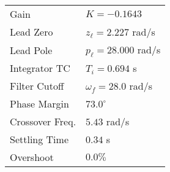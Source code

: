 \begin{tabular}{ll}
Gain & $K = -0.1643$ \\
Lead Zero & $z_\ell = 2.227$ rad/s \\
Lead Pole & $p_\ell = 28.000$ rad/s \\
Integrator TC & $T_i = 0.694$ s \\
Filter Cutoff & $\omega_f = 28.0$ rad/s \\
Phase Margin & $73.0^\circ$ \\
Crossover Freq. & $5.43$ rad/s \\
Settling Time & $0.34$ s \\
Overshoot & $0.0\%$ \\
\end{tabular}
